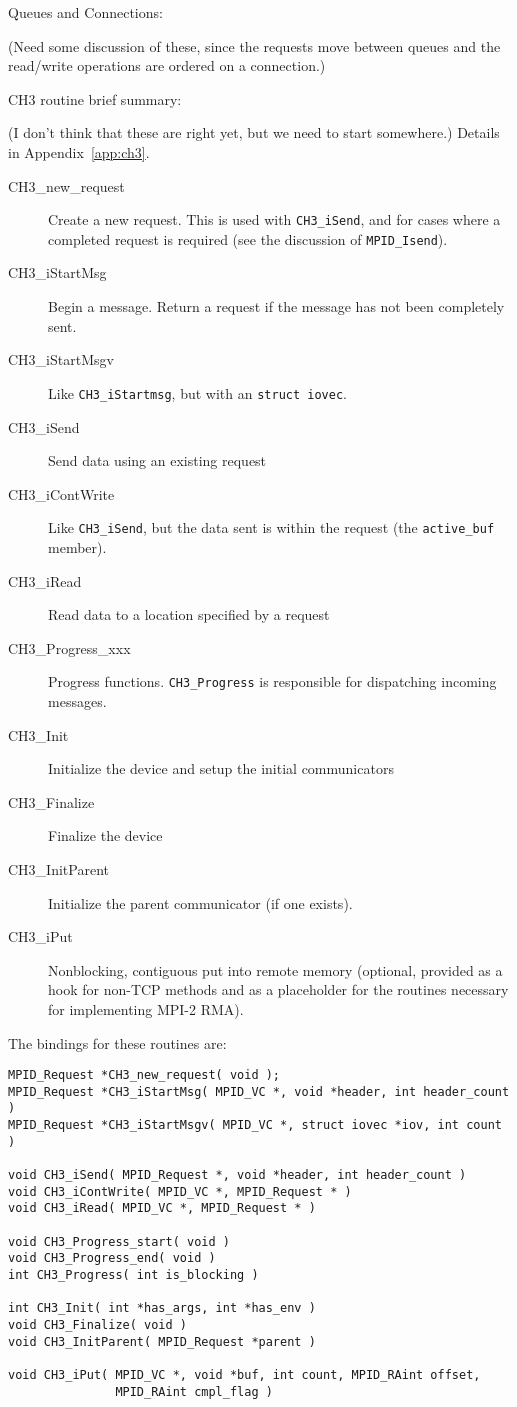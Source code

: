 \documentclass{article}
\def\mpids#1#2{\code{#2}\index{#1!#2}}
\def\code{\begingroup\makeustext\eatcode}
\def\eatcode#1{\texttt{#1}\endgroup}
\begin{document}
Queues and Connections:

(Need some discussion of these, since the requests move between queues and the 
read/write operations are ordered on a connection.)

CH3 routine brief summary:

(I don't think that these are right yet, but we need to start somewhere.)
Details in Appendix~\ref{app:ch3}.

\begin{description}
\item[CH3\_new\_request]Create a new request. This is used with
  \code{CH3_iSend}, and for cases where a completed request is required (see
  the discussion of \code{MPID_Isend}).
\item[CH3\_iStartMsg]Begin a message.  Return a request if the message has not
  been completely sent.
\item[CH3\_iStartMsgv]Like \code{CH3_iStartmsg}, but with an \code{struct
    iovec}.
\item[CH3\_iSend]Send data using an existing request
\item[CH3\_iContWrite]Like \code{CH3_iSend}, but the data sent is within the
  request (the \mpids{MPID_Request}{active\_buf} member).
\item[CH3\_iRead]Read data to a location specified by a request
\item[CH3\_Progress\_xxx]Progress functions.  \code{CH3_Progress} is
  responsible for dispatching incoming messages.
\item[CH3\_Init]Initialize the device and setup the initial communicators
\item[CH3\_Finalize]Finalize the device
\item[CH3\_InitParent]Initialize the parent communicator (if one exists).
\item[CH3\_iPut]Nonblocking, contiguous put into remote memory (optional,
  provided as a hook for non-TCP methods and as a placeholder for the
  routines necessary for implementing MPI-2 RMA).
\end{description}

The bindings for these routines are:
\begin{verbatim}
MPID_Request *CH3_new_request( void );
MPID_Request *CH3_iStartMsg( MPID_VC *, void *header, int header_count )
MPID_Request *CH3_iStartMsgv( MPID_VC *, struct iovec *iov, int count )

void CH3_iSend( MPID_Request *, void *header, int header_count )
void CH3_iContWrite( MPID_VC *, MPID_Request * )
void CH3_iRead( MPID_VC *, MPID_Request * )

void CH3_Progress_start( void )
void CH3_Progress_end( void )
int CH3_Progress( int is_blocking )

int CH3_Init( int *has_args, int *has_env )
void CH3_Finalize( void )
void CH3_InitParent( MPID_Request *parent )

void CH3_iPut( MPID_VC *, void *buf, int count, MPID_RAint offset, 
               MPID_RAint cmpl_flag )
\end{verbatim}
\end{document}
